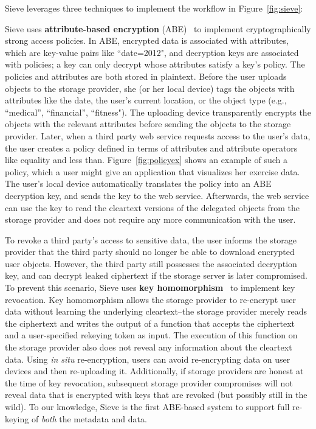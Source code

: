 Sieve leverages three techniques to implement
the workflow in Figure~\ref{fig:sieve}:\\
\begin{smitemize}
  \item Sieve uses \textbf{attribute-based encryption}
  (ABE)~\cite{kpabe} to implement cryptographically strong access
  policies. In ABE, encrypted data is 
  associated with attributes, which are key-value 
  pairs like ``date=2012", and decryption keys are 
  associated with policies; a key can only
  decrypt whose attributes satisfy a key's
  policy. The policies and attributes are both
  stored in plaintext. Before the user uploads
  objects to the storage provider, she (or her local
  device) tags the objects with attributes like the
  date, the user's current location, or the object type
  (e.g., ``medical'', ``financial'', ``fitness").
  The uploading device transparently encrypts the objects
  with the relevant attributes before sending the objects to
  the storage provider. Later, when a third party web service 
  requests access to the user's data, the user creates a policy
  defined in terms of attributes and attribute
  operators like equality and less than. Figure~\ref{fig:policyex}
  shows an example of such a policy, which a user
  might give an application that visualizes her exercise data.
  The user's local device automatically translates the
  policy into an ABE decryption key, and sends the key
  to the web service. Afterwards, the web service can use
  the key to read the cleartext versions of the delegated
  objects from the storage provider and does not require
  any more communication with the user.
  
  \item To revoke a third party's access to sensitive data,
  the user informs the storage provider that the third
  party should no longer be able to download encrypted
  user objects. However, the third party still possesses
  the associated decryption key, and can decrypt leaked
  ciphertext if the storage server is later compromised.
  To prevent this scenario, Sieve uses \textbf{key
  homomorphism}~\cite{keyhom} to implement key revocation. Key
  homomorphism allows the storage provider
  to re-encrypt user data without learning the underlying
  cleartext--the storage provider merely reads the
  ciphertext and writes the output of a function that
  accepts the ciphertext and a user-specified rekeying
  token as input. The execution of this function on the storage 
  provider also does not reveal any information about the 
  cleartext data. Using \textit{in situ} re-encryption,
  users can avoid re-encrypting data on user devices and
  then re-uploading it. Additionally, if storage providers
  are honest at the time of key revocation, subsequent
  storage provider compromises will not reveal data that
  is encrypted with keys that are revoked (but possibly
  still in the wild). To our knowledge, Sieve is the first 
  ABE-based system to support full re-keying of \textit{both}
  the metadata and data.


\end{smitemize}
